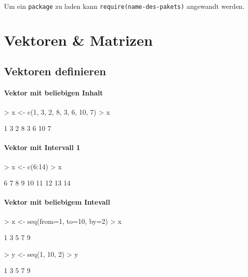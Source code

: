Um ein \lstinline{package} zu laden kann 
\lstinline{require(name-des-pakets)} angewandt werden.


\section{Vektoren \& Matrizen}

\subsection{Vektoren definieren}

\paragraph{Vektor mit beliebigen Inhalt}
\begin{Schunk}
\begin{Sinput}
> x <- c(1, 3, 2, 8, 3, 6, 10, 7) 
> x
\end{Sinput}
\begin{Soutput}
[1]  1  3  2  8  3  6 10  7
\end{Soutput}
\end{Schunk}

\paragraph{Vektor mit Intervall 1}
\begin{Schunk}
\begin{Sinput}
> x <- c(6:14)
> x
\end{Sinput}
\begin{Soutput}
[1]  6  7  8  9 10 11 12 13 14
\end{Soutput}
\end{Schunk}

\paragraph{Vektor mit beliebigem Intevall}
\begin{Schunk}
\begin{Sinput}
> x <- seq(from=1, to=10, by=2)
> x
\end{Sinput}
\begin{Soutput}
[1] 1 3 5 7 9
\end{Soutput}
\begin{Sinput}
> y <- seq(1, 10, 2)
> y
\end{Sinput}
\begin{Soutput}
[1] 1 3 5 7 9
\end{Soutput}
\end{Schunk}

